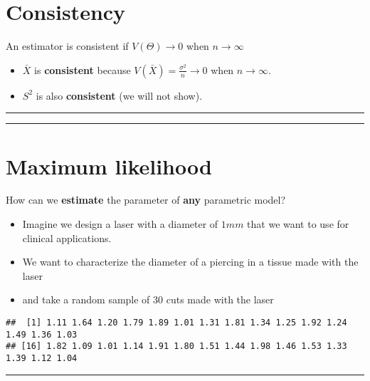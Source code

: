 \documentclass[
]{book}
\begin{document}
\hypertarget{consistency}{%
\section{Consistency}\label{consistency}}

An estimator is consistent if \(V(\Theta) \rightarrow 0\) when \(n \rightarrow \infty\)

\begin{itemize}
\item
  \(\bar{X}\) is \textbf{consistent} because \(V(\bar{X})=\frac{\sigma^2}{n}\rightarrow 0\) when \(n \rightarrow \infty\).
\item
  \(S^2\) is also \textbf{consistent} (we will not show).
\end{itemize}

\begin{center}\rule{0.5\linewidth}{0.5pt}\end{center}

\begin{center}\rule{0.5\linewidth}{0.5pt}\end{center}

\hypertarget{maximum-likelihood-1}{%
\section{Maximum likelihood}\label{maximum-likelihood-1}}

How can we \textbf{estimate} the parameter of \textbf{any} parametric model?

\begin{itemize}
\item
  Imagine we design a laser with a diameter of \(1mm\) that we want to use for clinical applications.
\item
  We want to characterize the diameter of a piercing in a tissue made with the laser
\item
  and take a random sample of \(30\) cuts made with the laser
\end{itemize}

\begin{verbatim}
##  [1] 1.11 1.64 1.20 1.79 1.89 1.01 1.31 1.81 1.34 1.25 1.92 1.24 1.49 1.36 1.03
## [16] 1.82 1.09 1.01 1.14 1.91 1.80 1.51 1.44 1.98 1.46 1.53 1.33 1.39 1.12 1.04
\end{verbatim}

\begin{center}\rule{0.5\linewidth}{0.5pt}\end{center}
\end{document}
